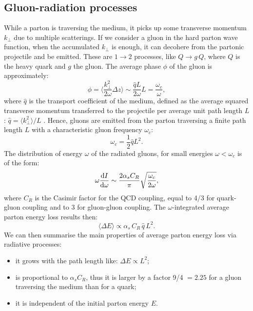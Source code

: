 \subsection{Gluon-radiation processes}
\label{sec:rad}
While a parton is traversing the medium, it picks up some transverse 
momentum $k_{\perp}$ due to multiple scatterings. 
If we consider a gluon in the hard parton wave function, when the 
accumulated $k_{\perp}$ is enough, it can decohere from the partonic projectile and be emitted.
These are $1 \rightarrow 2$ processes, like $Q \rightarrow g\, Q$, 
where $Q$ is the heavy quark and $g$ the gluon.
The average phase $\phi$ of the gluon is approximately:
\begin{equation}
\label{eq:gluonPhase}
\phi = {\Big \langle} \frac{k_{\perp}^2}{2\omega} \Delta z {\Big \rangle} \sim \frac{\hat{q} L}{2 \omega} L = \frac{\omega_c}{\omega},
\end{equation}
where $\hat{q}$ is the transport coefficient of the medium, 
defined as the average squared transverse 
momentum transferred to the projectile per average unit path 
length $L$: $\hat{q} = \langle k_{\perp}^2 \rangle / L$ \cite{Salgado:2003gb,}.
Hence, gluons are emitted from the parton traversing a finite path 
length $L$ with a characteristic gluon frequency $\omega_c$:
\begin{equation}
\label{eq:gluonPhase}
\omega_c = \frac{1}{2} \hat{q} L^2.
\end{equation}
The distribution of energy $\omega$ of the radiated gluons, 
for small energies $\omega < \omega_c$ is of the form:
\begin{equation}
\label{eq:gluonEnDistrb}
\omega \frac{{\rm d} I}{{\rm d} \omega} \sim \frac{2 \alpha_s C_R}{\pi} \sqrt{ \frac{\omega_c}{2 \omega}},
\end{equation}
where $C_R$ is the Casimir factor for the QCD coupling, 
equal to 4/3 for quark-gluon coupling and to 3 for gluon-gluon coupling.
The $\omega$-integrated average parton energy loss results then:
\begin{equation}
\label{eq:RadEnLoss}
\langle \Delta E \rangle \propto \alpha_s \, C_R \, \hat{q} \, L^2. 
\end{equation}
We can then summarise the main properties of average parton 
energy loss via radiative processes:
\begin{itemize}
\item it grows with the path length like: $\Delta E \propto L^2$;
\item is proportional to $\alpha_s C_R$, thus it is larger by a factor 
9/4 $ = 2.25$ for a gluon traversing the medium than for a quark;
\item it is independent of the initial parton energy $E$.
\end{itemize}
